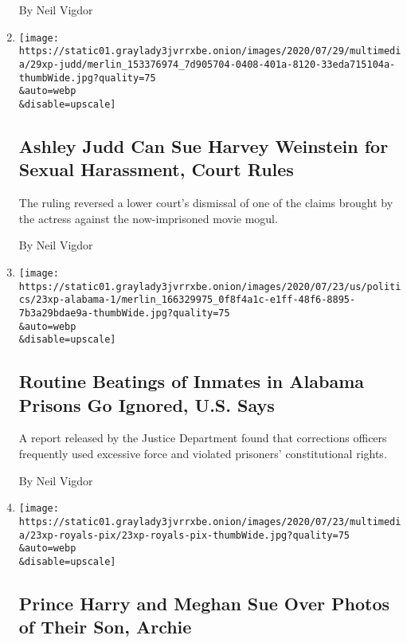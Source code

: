 \begin{enumerate}
  By Neil Vigdor
\item
  \href{/2020/07/29/business/media/judd-weinstein-lawsuit-appeal.html}{}

  \texttt{[image: https://static01.graylady3jvrrxbe.onion/images/2020/07/29/multimedia/29xp-judd/merlin\_153376974\_7d905704-0408-401a-8120-33eda715104a-thumbWide.jpg?quality=75\\\&auto=webp\\\&disable=upscale]}

  \hypertarget{ashley-judd-can-sue-harvey-weinstein-for-sexual-harassment-court-rules}{%
  \subsection{Ashley Judd Can Sue Harvey Weinstein for Sexual
  Harassment, Court
  Rules}\label{ashley-judd-can-sue-harvey-weinstein-for-sexual-harassment-court-rules}}

  The ruling reversed a lower court's dismissal of one of the claims
  brought by the actress against the now-imprisoned movie mogul.

  By Neil Vigdor
\item
  \href{/2020/07/24/us/alabama-prisons-excessive-force.html}{}

  \texttt{[image: https://static01.graylady3jvrrxbe.onion/images/2020/07/23/us/politics/23xp-alabama-1/merlin\_166329975\_0f8f4a1c-e1ff-48f6-8895-7b3a29bdae9a-thumbWide.jpg?quality=75\\\&auto=webp\\\&disable=upscale]}

  \hypertarget{routine-beatings-of-inmates-in-alabama-prisons-go-ignored-us-says}{%
  \subsection{Routine Beatings of Inmates in Alabama Prisons Go Ignored,
  U.S.
  Says}\label{routine-beatings-of-inmates-in-alabama-prisons-go-ignored-us-says}}

  A report released by the Justice Department found that corrections
  officers frequently used excessive force and violated prisoners'
  constitutional rights.

  By Neil Vigdor
\item
  \href{/2020/07/23/us/meghan-harry-paparazzi.html}{}

  \texttt{[image: https://static01.graylady3jvrrxbe.onion/images/2020/07/23/multimedia/23xp-royals-pix/23xp-royals-pix-thumbWide.jpg?quality=75\\\&auto=webp\\\&disable=upscale]}

  \hypertarget{prince-harry-and-meghan-sue-over-photos-of-their-son-archie}{%
  \subsection{Prince Harry and Meghan Sue Over Photos of Their Son,
  Archie}\label{prince-harry-and-meghan-sue-over-photos-of-their-son-archie}}


\end{enumerate}
